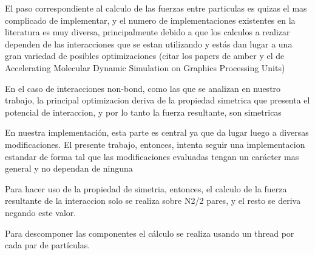 El paso correspondiente al calculo de las fuerzas entre particulas es quizas el mas complicado de implementar, y el numero de implementaciones existentes en la literatura es muy diversa, principalmente debido a que los calculos a realizar dependen de las interacciones que se estan utilizando y estás dan lugar a una gran variedad de posibles optimizaciones
\cite{friedrichs2009accelerating}\cite{gotz2012routine}\cite{salomon2013routine}
(citar los papers de amber y el de Accelerating Molecular Dynamic Simulation on Graphics Processing Units)


En el caso de interacciones non-bond, como las que se analizan en nuestro trabajo, la principal optimizacion deriva de la propiedad simetrica que presenta el potencial de interaccion, y por lo tanto la fuerza resultante, son simetricas

En nuestra implementación, esta parte es central ya que da lugar luego a diversas modificaciones. El presente trabajo, entonces, intenta seguir una implementacion estandar de forma tal que las modificaciones evaluadas tengan un carácter mas general y no dependan de ninguna

Para hacer uso de la propiedad de simetria, entonces, el calculo de la fuerza resultante de la interaccion solo se realiza sobre N2/2 pares, y el resto se deriva negando este valor.


Para descomponer las componentes el cálculo se realiza usando un thread por cada par de partículas.

